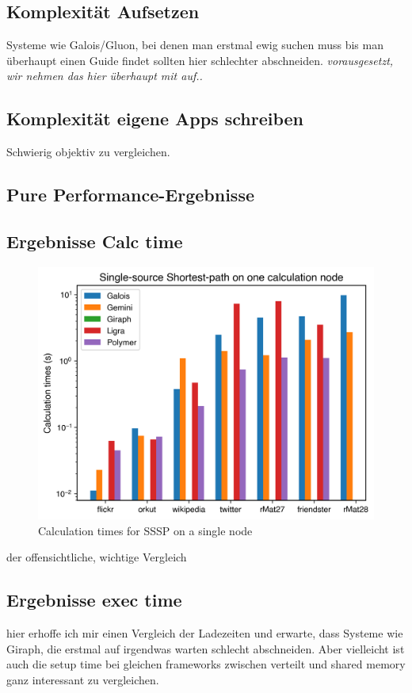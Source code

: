 

\subsection{Komplexität Aufsetzen}
Systeme wie Galois/Gluon, bei denen man erstmal ewig suchen muss bis man überhaupt einen Guide findet sollten hier schlechter abschneiden. \emph{vorausgesetzt, wir nehmen das hier überhaupt mit auf..}

\subsection{Komplexität eigene Apps schreiben}
Schwierig objektiv zu vergleichen.


\subsection{Pure Performance-Ergebnisse}

\subsection{Ergebnisse Calc time}
\begin{figure}
	\includegraphics[width=\columnwidth]{../../plots/singleNodeSSSP.png}
	\caption{Calculation times for SSSP on a single node}
	\label{fig:ssspSingleNode}
\end{figure}
der offensichtliche, wichtige Vergleich

\subsection{Ergebnisse exec time}

hier erhoffe ich mir einen Vergleich der Ladezeiten und erwarte, dass Systeme wie Giraph, die erstmal auf irgendwas warten schlecht abschneiden.
Aber vielleicht ist auch die setup time bei gleichen frameworks zwischen verteilt und shared memory ganz interessant zu vergleichen. 

